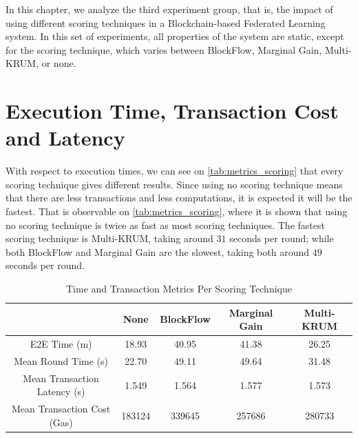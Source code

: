 In this chapter, we analyze the third experiment group, that is, the impact of using different scoring techniques in a Blockchain-based Federated Learning system. In this set of experiments, all properties of the system are static, except for the scoring technique, which varies between BlockFlow, Marginal Gain, Multi-KRUM, or none.

\section{Execution Time, Transaction Cost and Latency}

With respect to execution times, we can see on \autoref{tab:metrics_scoring} that every scoring technique gives different results. Since using no scoring technique means that there are less transactions and less computations, it is expected it will be the fastest. That is observable on \autoref{tab:metrics_scoring}, where it is shown that using no scoring technique is twice as fast as most scoring techniques. The fastest scoring technique is Multi-KRUM, taking around $31$ seconds per round; while both BlockFlow and Marginal Gain are the slowest, taking both around $49$ seconds per round.

\begin{table}[!ht]
\centering
\begin{tabular}{c|c|c|c|c} \hline \hline
                               & None   & BlockFlow & Marginal Gain & Multi-KRUM \\ \hline \hline
E2E Time (m)                   & 18.93  & 40.95     & 41.38         & 26.25      \\ \hline
Mean Round Time (s)            & 22.70  & 49.11     & 49.64         & 31.48      \\ \hline
Mean Transaction Latency (s)   & 1.549  & 1.564     & 1.577         & 1.573      \\ \hline
Mean Transaction Cost (Gas)    & 183124 & 339645    & 257686        & 280733     \\ \hline
\end{tabular}
\caption{Time and Transaction Metrics Per Scoring Technique}
\label{tab:metrics_scoring}
\end{table}

